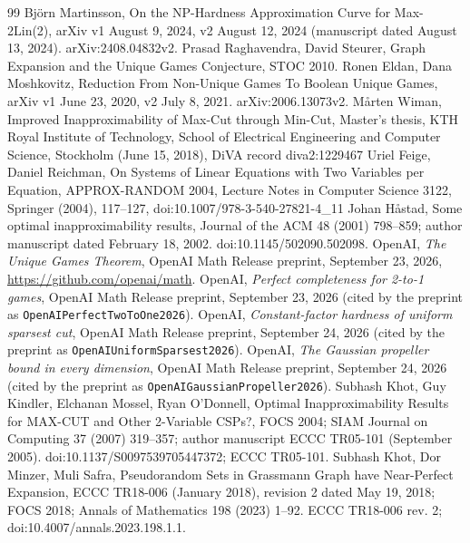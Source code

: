 \documentclass[11pt]{article}
\begin{document}
\begin{thebibliography}{99}
 Björn Martinsson, On the NP-Hardness Approximation Curve for Max-2Lin(2), arXiv v1 August 9, 2024, v2 August 12, 2024 (manuscript dated August 13, 2024). arXiv:2408.04832v2.
 Prasad Raghavendra, David Steurer, Graph Expansion and the Unique Games Conjecture, STOC 2010.
 Ronen Eldan, Dana Moshkovitz, Reduction From Non-Unique Games To Boolean Unique Games, arXiv v1 June 23, 2020, v2 July 8, 2021. arXiv:2006.13073v2.
 M{\aa}rten Wiman, Improved Inapproximability of Max-Cut through Min-Cut, Master's thesis, KTH Royal Institute of Technology, School of Electrical Engineering and Computer Science, Stockholm (June 15, 2018), DiVA record diva2:1229467
 Uriel Feige, Daniel Reichman, On Systems of Linear Equations with Two Variables per Equation, APPROX-RANDOM 2004, Lecture Notes in Computer Science 3122, Springer (2004), 117--127, doi:10.1007/978-3-540-27821-4\_11
 Johan Håstad, Some optimal inapproximability results, Journal of the ACM 48 (2001) 798--859; author manuscript dated February 18, 2002. doi:10.1145/502090.502098.
 OpenAI, \emph{The Unique Games Theorem}, OpenAI Math Release preprint, September 23, 2026, \url{https://github.com/openai/math}.
 OpenAI, \emph{Perfect completeness for 2-to-1 games}, OpenAI Math Release preprint, September 23, 2026 (cited by the preprint as \texttt{OpenAIPerfectTwoToOne2026}).
 OpenAI, \emph{Constant-factor hardness of uniform sparsest cut}, OpenAI Math Release preprint, September 24, 2026 (cited by the preprint as \texttt{OpenAIUniformSparsest2026}).
 OpenAI, \emph{The Gaussian propeller bound in every dimension}, OpenAI Math Release preprint, September 24, 2026 (cited by the preprint as \texttt{OpenAIGaussianPropeller2026}).
 Subhash Khot, Guy Kindler, Elchanan Mossel, Ryan O'Donnell, Optimal Inapproximability Results for MAX-CUT and Other 2-Variable CSPs?, FOCS 2004; SIAM Journal on Computing 37 (2007) 319--357; author manuscript ECCC TR05-101 (September 2005). doi:10.1137/S0097539705447372; ECCC TR05-101.
 Subhash Khot, Dor Minzer, Muli Safra, Pseudorandom Sets in Grassmann Graph have Near-Perfect Expansion, ECCC TR18-006 (January 2018), revision 2 dated May 19, 2018; FOCS 2018; Annals of Mathematics 198 (2023) 1--92. ECCC TR18-006 rev. 2; doi:10.4007/annals.2023.198.1.1.

\end{thebibliography}
\end{document}
